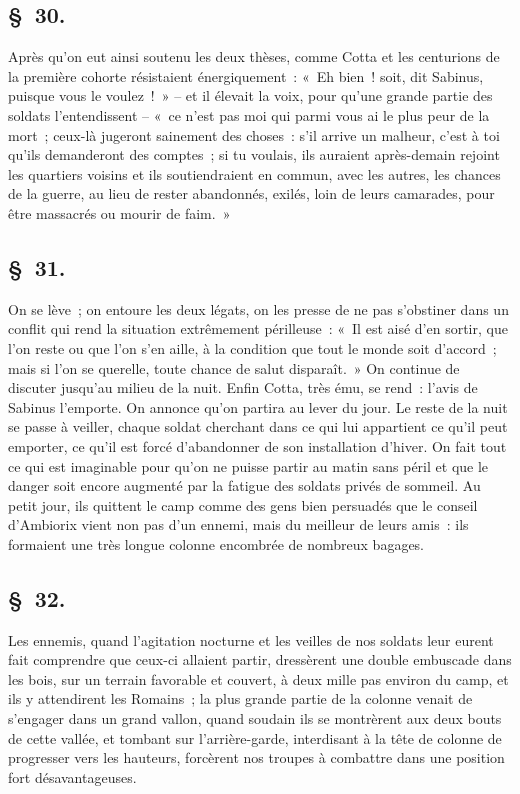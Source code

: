 \documentclass[french,twoside]{book} %
\begin{document}
\subsection[{§ 30.}]{ \textsc{§ 30.} }
\noindent Après qu’on eut ainsi soutenu les deux thèses, comme Cotta et les centurions de la première cohorte résistaient énergiquement : « Eh bien ! soit, dit Sabinus, puisque vous le voulez ! » – et il élevait la voix, pour qu’une grande partie des soldats l’entendissent – « ce n’est pas moi qui parmi vous ai le plus peur de la mort ; ceux-là jugeront sainement des choses : s’il arrive un malheur, c’est à toi qu’ils demanderont des comptes ; si tu voulais, ils auraient après-demain rejoint les quartiers voisins et ils soutiendraient en commun, avec les autres, les chances de la guerre, au lieu de rester abandonnés, exilés, loin de leurs camarades, pour être massacrés ou mourir de faim. »
\subsection[{§ 31.}]{ \textsc{§ 31.} }
\noindent On se lève ; on entoure les deux légats, on les presse de ne pas s’obstiner dans un conflit qui rend la situation extrêmement périlleuse : « Il est aisé d’en sortir, que l’on reste ou que l’on s’en aille, à la condition que tout le monde soit d’accord ; mais si l’on se querelle, toute chance de salut disparaît. » On continue de discuter jusqu’au milieu de la nuit. Enfin Cotta, très ému, se rend : l’avis de Sabinus l’emporte. On annonce qu’on partira au lever du jour. Le reste de la nuit se passe à veiller, chaque soldat cherchant dans ce qui lui appartient ce qu’il peut emporter, ce qu’il est forcé d’abandonner de son installation d’hiver. On fait tout ce qui est imaginable pour qu’on ne puisse partir au matin sans péril et que le danger soit encore augmenté par la fatigue des soldats privés de sommeil. Au petit jour, ils quittent le camp comme des gens bien persuadés que le conseil d’Ambiorix vient non pas d’un ennemi, mais du meilleur de leurs amis : ils formaient une très longue colonne encombrée de nombreux bagages.
\subsection[{§ 32.}]{ \textsc{§ 32.} }
\noindent Les ennemis, quand l’agitation nocturne et les veilles de nos soldats leur eurent fait comprendre que ceux-ci allaient partir, dressèrent une double embuscade dans les bois, sur un terrain favorable et couvert, à deux mille pas environ du camp, et ils y attendirent les Romains ; la plus grande partie de la colonne venait de s’engager dans un grand vallon, quand soudain ils se montrèrent aux deux bouts de cette vallée, et tombant sur l’arrière-garde, interdisant à la tête de colonne de progresser vers les hauteurs, forcèrent nos troupes à combattre dans une position fort désavantageuses.
\end{document}
